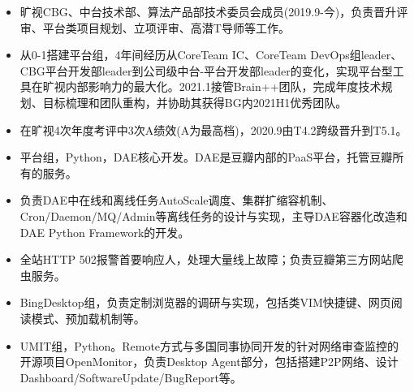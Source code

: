 \documentclass{resume}
\begin{document}
\begin{itemize}
  \item 旷视CBG、中台技术部、算法产品部技术委员会成员(2019.9-今)，负责晋升评审、平台类项目规划、立项评审、高潜T导师等工作。
	\item 从0-1搭建平台组，4年间经历从CoreTeam IC、CoreTeam DevOps组leader、CBG平台开发部leader到公司级中台-平台开发部leader的变化，实现平台型工具在旷视内部影响力的最大化。2021.1接管Brain++团队，完成年度技术规划、目标梳理和团队重构，并协助其获得BG内2021H1优秀团队。
	\item 在旷视4次年度考评中3次A绩效(A为最高档)，2020.9由T4.2跨级晋升到T5.1。
\end{itemize}

\begin{itemize}
  \item 平台组，Python，DAE核心开发。DAE是豆瓣内部的PaaS平台，托管豆瓣所有的服务。
  \item 负责DAE中在线和离线任务AutoScale调度、集群扩缩容机制、Cron/Daemon/MQ/Admin等离线任务的设计与实现，主导DAE容器化改造和DAE Python Framework的开发。
  \item 全站HTTP 502报警首要响应人，处理大量线上故障；负责豆瓣第三方网站爬虫服务。
\end{itemize}

\begin{itemize}
  \item BingDesktop组，负责定制浏览器的调研与实现，包括类VIM快捷键、网页阅读模式、预加载机制等。
\end{itemize}

\begin{itemize}
  \item UMIT组，Python。Remote方式与多国同事协同开发的针对网络审查监控的开源项目OpenMonitor，负责Desktop Agent部分，包括搭建P2P网络、设计Dashboard/SoftwareUpdate/BugReport等。
\end{itemize}
\end{document}
